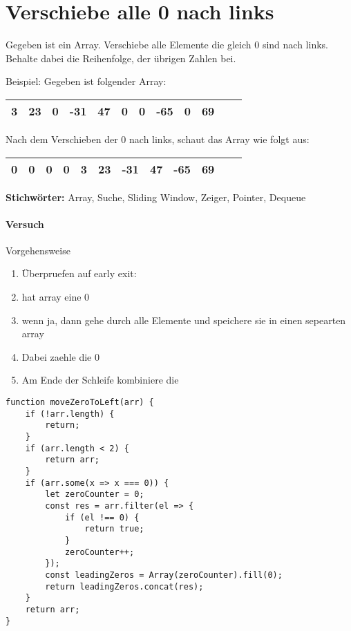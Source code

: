 \documentclass[babel]{book}
\begin{document}
\section{Verschiebe alle 0 nach links}
\begin{examplei}
Gegeben ist ein Array. Verschiebe alle Elemente die gleich 0 sind nach links. Behalte dabei die Reihenfolge, der übrigen Zahlen bei.

Beispiel:
Gegeben ist folgender Array:
\\
\begin{tabular}{|l|l|l|l|l|l|l|l|l|l|l|l|} 
	\hline
	3 & 23 & 0 & -31 & 47 & 0 & 0 &-65 & 0 & 69 \\
	\hline
\end{tabular}

Nach dem Verschieben der 0 nach links, schaut das Array wie folgt aus:

\begin{tabular}{|l|l|l|l|l|l|l|l|l|l|l|l|} 
	\hline
	0 & 0 & 0 & 0 & 3 & 23 & -31 & 47 & -65 & 69 \\
	\hline
\end{tabular}


\end{examplei}
{\bf Stichwörter:} Array, Suche, Sliding Window, Zeiger, Pointer, Dequeue

\paragraph{Versuch}
Vorgehensweise
\begin{enumerate} 
	\item Überpruefen auf early exit: 
	\item hat array eine 0
	\item wenn ja, dann gehe durch alle Elemente und speichere sie in einen sepearten array
	\item Dabei zaehle die 0
	\item Am Ende der Schleife kombiniere die 
\end{enumerate}

\begin{lstlisting}[caption=My Javascript Example]
function moveZeroToLeft(arr) {
	if (!arr.length) {
		return;
	}
	if (arr.length < 2) {
		return arr;
	}
	if (arr.some(x => x === 0)) {
		let zeroCounter = 0;
		const res = arr.filter(el => {
			if (el !== 0) {
				return true;
			}
			zeroCounter++;
		});
		const leadingZeros = Array(zeroCounter).fill(0);
		return leadingZeros.concat(res);
	}
	return arr;
}
\end{lstlisting}
\end{document}
